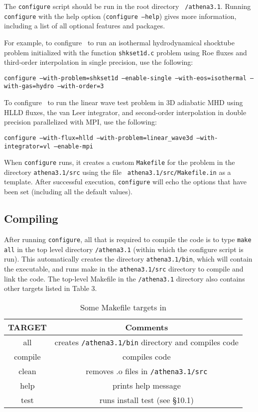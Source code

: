 The {\tt configure} script should be run in the root directory {\tt
/athena3.1}.  Running {\tt configure} with the help option ({\tt configure
--help}) gives more information, including a list of all optional features
and packages.

For example, to configure \ath\ to run an isothermal hydrodynamical shocktube
problem initialized with the function {\tt shkset1d.c} problem
using Roe fluxes and third-order interpolation in single precision, use the
following:
\begin{center}
{\tt configure --with-problem=shkset1d --enable-single --with-eos=isothermal --with-gas=hydro --with-order=3}
\end{center}

To configure \ath\ to run the linear wave test problem in 3D adiabatic
MHD using HLLD fluxes, the van Leer integrator, and second-order interpolation in double precision
parallelized with MPI, use the following:
\begin{center}
{\tt configure --with-flux=hlld --with-problem=linear\_wave3d --with-integrator=vl --enable-mpi}
\end{center}

When {\tt configure} runs, it creates a custom {\tt Makefile} for the
problem in the directory {\tt athena3.1/src} using the file {\tt
athena3.1/src/Makefile.in} as a template.  After successful execution,
{\tt configure} will echo the options that have been set (including all
the default values).

\subsection{Compiling \ath}

After running {\tt configure}, all that is required to compile the code
is to type {\tt make all} in the top level directory {\tt /athena3.1}
(within which the configure script is run).  This automatically creates
the directory {\tt athena3.1/bin}, which will contain the executable,
and runs make in the {\tt athena3.1/src} directory to compile and link
the code.  The top-level Makefile in the {\tt /athena3.1} directory also
contains other targets listed in Table 3.

\begin{center}
\begin{table}[ht]
\caption{Some Makefile targets in \ath}
\begin{tabular}{|c|c|} \hline \hline
TARGET & Comments \\ \hline
all & creates {\tt /athena3.1/bin} directory and compiles code \\
compile & compiles code \\
clean & removes .o files in {\tt /athena3.1/src} \\
help & prints help message \\
test & runs install test (see \S 10.1) \\
\hline
\end{tabular}
\end{table}
\end{center}

